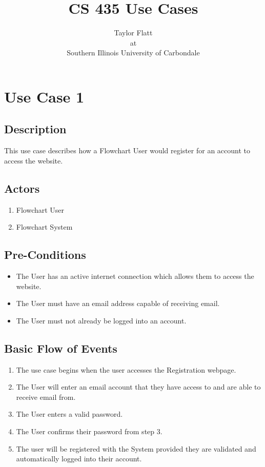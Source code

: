 \documentclass[a4paper,11pt]{article}
\title{CS 435 Use Cases}
\author{
Taylor Flatt \\
at \\
Southern Illinois University of Carbondale
}
\begin{document}
\maketitle
\tableofcontents

\section{Use Case 1}
\subsection{Description}
This use case describes how a Flowchart User would register for an account to access the website.

\subsection{Actors}
\begin{enumerate}
\item Flowchart User
\item Flowchart System
\end{enumerate}

\subsection{Pre-Conditions}
\begin{itemize}
\item The User has an active internet connection which allows them to access the website.
\item The User must have an email address capable of receiving email.
\item The User must not already be logged into an account.
\end{itemize}

\subsection{Basic Flow of Events}
\begin{enumerate}
\item The use case begins when the user accesses the Registration webpage.
\item The User will enter an email account that they have access to and are able to receive email from.
\item The User enters a valid password.
\item The User confirms their password from step 3.
\item The user will be registered with the System provided they are validated and automatically logged into their account.
\end{enumerate}
\end{document}
